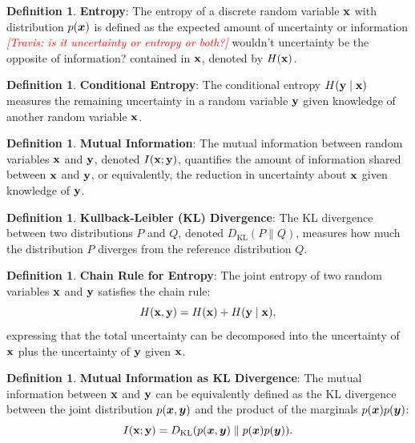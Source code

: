 \documentclass[11pt, oneside]{book}
\theoremstyle{plain}
\theoremstyle{definition}
\newtheorem{definition}[theorem]{Definition}
\theoremstyle{remark}
\newcommand{\travis}[1]{\textcolor{red}{{\it [Travis: #1]}}}
\begin{document}
\begin{definition}
\textbf{Entropy}: The entropy of a discrete random variable ${\mathbf{x}}$ with distribution $p({\bm{x}})$ is defined as the expected amount of uncertainty or information \travis{is it uncertainty or entropy or both?} wouldn't uncertainty be the opposite of information? contained in ${\mathbf{x}}$, denoted by $H({\mathbf{x}})$.
\label{def:entropy}
\end{definition}

\begin{definition}
\textbf{Conditional Entropy}: The conditional entropy $H({\mathbf{y}} \mid {\mathbf{x}})$ measures the remaining uncertainty in a random variable ${\mathbf{y}}$ given knowledge of another random variable ${\mathbf{x}}$.
\label{def:conditional_entropy}
\end{definition}

\begin{definition}
\textbf{Mutual Information}: The mutual information between random variables ${\mathbf{x}}$ and ${\mathbf{y}}$, denoted $I({\mathbf{x}}; {\mathbf{y}})$, quantifies the amount of information shared between ${\mathbf{x}}$ and ${\mathbf{y}}$, or equivalently, the reduction in uncertainty about ${\mathbf{x}}$ given knowledge of ${\mathbf{y}}$.
\label{def:mutual_information}
\end{definition}

\begin{definition}
\textbf{Kullback-Leibler (KL) Divergence}: The KL divergence between two distributions $P$ and $Q$, denoted $D_{\mathrm{KL}}(P \parallel Q)$, measures how much the distribution $P$ diverges from the reference distribution $Q$.
\label{def:kl_divergence}
\end{definition}

\begin{definition}
\textbf{Chain Rule for Entropy}: The joint entropy of two random variables ${\mathbf{x}}$ and ${\mathbf{y}}$ satisfies the chain rule:
\[
H({\mathbf{x}}, {\mathbf{y}}) = H({\mathbf{x}}) + H({\mathbf{y}} \mid {\mathbf{x}}),
\]
expressing that the total uncertainty can be decomposed into the uncertainty of ${\mathbf{x}}$ plus the uncertainty of ${\mathbf{y}}$ given ${\mathbf{x}}$.
\label{def:chain_rule}
\end{definition}

\begin{definition}
\textbf{Mutual Information as KL Divergence}: The mutual information between ${\mathbf{x}}$ and ${\mathbf{y}}$ can be equivalently defined as the KL divergence between the joint distribution $p({\bm{x}}, {\bm{y}})$ and the product of the marginals $p({\bm{x}})p({\bm{y}})$:
\[
I({\mathbf{x}}; {\mathbf{y}}) = D_{\mathrm{KL}}(p({\bm{x}}, {\bm{y}}) \parallel p({\bm{x}})p({\bm{y}})).
\]
\label{def:mi_kl}
\end{definition}
\end{document}
